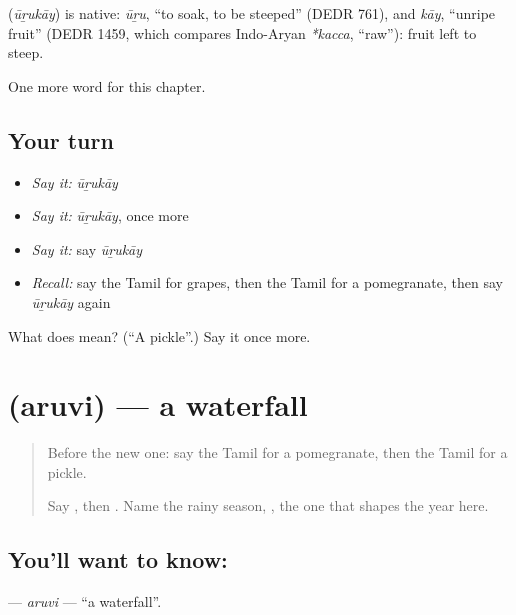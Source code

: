 \begin{cousinweb}
\textbf{} (\emph{ūṟukāy}) is native: \emph{ūṟu}, \textquotedblleft{}to soak, to be steeped\textquotedblright{} (DEDR 761), and \emph{kāy}, \textquotedblleft{}unripe fruit\textquotedblright{} (DEDR 1459, which compares Indo-Aryan \emph{*kacca}, \textquotedblleft{}raw\textquotedblright{}): fruit left to steep.
\end{cousinweb}

\begin{grammarlens}[title={What you've built}]
One more word for this chapter.
\end{grammarlens}

\subsection*{Your turn}
\begin{itemize}
\raggedright
  \item \emph{Say it:} \emph{ūṟukāy}
  \item \emph{Say it:} \emph{ūṟukāy}, once more
  \item \emph{Say it:} say \emph{ūṟukāy}
  \item \emph{Recall:} say the Tamil for grapes, then the Tamil for a pomegranate, then say \emph{ūṟukāy} again
\end{itemize}

\begin{tcolorbox}[breakable,colback=teal!4,colframe=teal!35!black,title={Before you move on}]
What does  mean? (\textquotedblleft{}A pickle\textquotedblright{}.) Say it once more.
\end{tcolorbox}
\section[\texorpdfstring{\ta{அருவி} (aruvi)}{அருவி (aruvi)}]{ (aruvi) — a waterfall}

\label{lesson:TA-C140-aruvi}



\begin{quote}
Before the new one: say the Tamil for a pomegranate, then the Tamil for a pickle.

Say \textbf{}, then \textbf{ }. Name the rainy season, \textbf{ }, the one that shapes the year here.
\end{quote}

\subsection*{You'll want to know: }
\textbf{} — \emph{aruvi} — \textquotedblleft{}a waterfall\textquotedblright{}.

